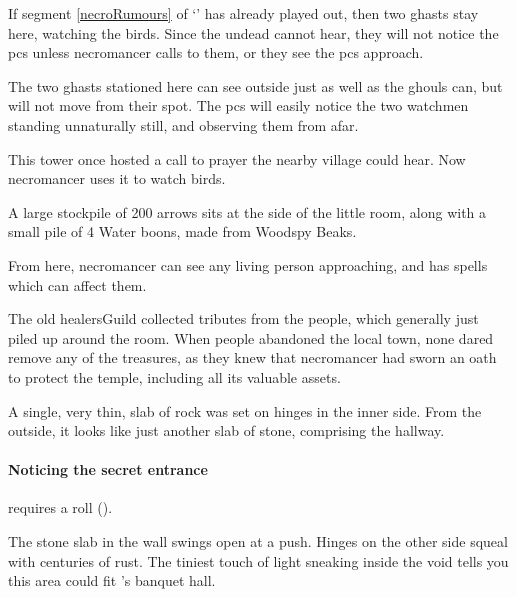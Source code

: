 \begin{multicols}{2}

If \gls{segment} \ref{necroRumours} of `' has already played out, then two ghasts stay here, watching the birds.
Since the undead cannot hear, they will not notice the \glspl{pc} unless \gls{necromancer} calls to them, or they see the \glspl{pc} approach.


The two ghasts stationed here can see outside just as well as the ghouls can, but will not move from their spot.
The \glspl{pc} will easily notice the two watchmen standing unnaturally still, and observing them from afar.


\begin{exampletext}
This tower once hosted a call to prayer the nearby \gls{village} could hear.
Now \gls{necromancer} uses it to watch birds.
\end{exampletext}

A large stockpile of 200 arrows sits at the side of the little room, along with a small pile of 4 Water \glspl{boon}, made from Woodspy Beaks.

From here, \gls{necromancer} can see any living person approaching, and has spells which can affect them.

\thenecromancer

\showStdSpells


\begin{exampletext}
  The old \gls{healersGuild} collected tributes from the people, which generally just piled up around the room.
  When people abandoned the local town, none dared remove any of the treasures, as they knew that \gls{necromancer} had sworn an oath to protect the temple, including all its valuable assets.
\end{exampletext}

\noindent
A single, very thin, slab of rock was set on hinges in the inner side.
From the outside, it looks like just another slab of stone, comprising the hallway.

\paragraph{Noticing the secret entrance}
requires a  roll (\tn[12]).

\begin{boxtext}
  The stone slab in the wall swings open at a push.
  Hinges on the other side squeal with centuries of rust.
  The tiniest touch of light sneaking inside the void tells you this area could fit 's banquet hall.
\end{boxtext}


\end{multicols}
